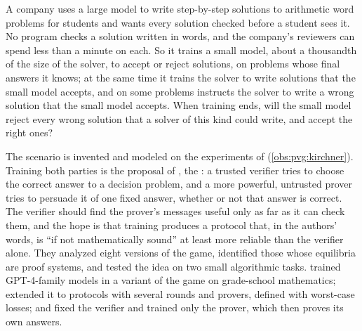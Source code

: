 \begin{refsection}
\begin{oversight}
A company uses a large model to write step-by-step solutions to arithmetic word problems for students and wants every solution checked before a student sees it. No program checks a solution written in words, and the company's reviewers can spend less than a minute on each. So it trains a small model, about a thousandth of the size of the solver, to accept or reject solutions, on problems whose final answers it knows; at the same time it trains the solver to write solutions that the small model accepts, and on some problems instructs the solver to write a wrong solution that the small model accepts. When training ends, will the small model reject every wrong solution that a solver of this kind could write, and accept the right ones?
\end{oversight}

The scenario is invented and modeled on the experiments of \textcite{KirchnerEtAl2024} (\cref{obs:pvg:kirchner}). Training both parties is the proposal of \textcite{AnilEtAl2021}, the : a trusted verifier tries to choose the correct answer to a decision problem, and a more powerful, untrusted prover tries to persuade it of one fixed answer, whether or not that answer is correct. The verifier should find the prover's messages useful only as far as it can check them, and the hope is that training produces a protocol that, in the authors' words, is ``if not mathematically sound'' at least more reliable than the verifier alone. They analyzed eight versions of the game, identified those whose equilibria are proof systems, and tested the idea on two small algorithmic tasks. \Textcite{KirchnerEtAl2024} trained GPT-4-family models in a variant of the game on grade-school mathematics; \textcite{HammondAdamDay2025} extended it to protocols with several rounds and provers, defined with worst-case losses; and \textcite{AmitEtAl2025} fixed the verifier and trained only the prover, which then proves its own answers.


\end{refsection}
